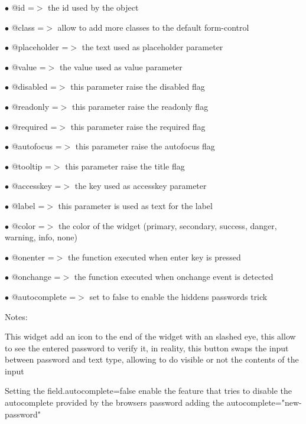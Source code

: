 \documentclass[a4paper]{article}
\begin{document}
\begin{compactitem}
\item[\color{myblue}$\bullet$] @id           =$>$ the id used by the object
\item[\color{myblue}$\bullet$] @class        =$>$ allow to add more classes to the default form-control
\item[\color{myblue}$\bullet$] @placeholder  =$>$ the text used as placeholder parameter
\item[\color{myblue}$\bullet$] @value        =$>$ the value used as value parameter
\item[\color{myblue}$\bullet$] @disabled     =$>$ this parameter raise the disabled flag
\item[\color{myblue}$\bullet$] @readonly     =$>$ this parameter raise the readonly flag
\item[\color{myblue}$\bullet$] @required     =$>$ this parameter raise the required flag
\item[\color{myblue}$\bullet$] @autofocus    =$>$ this parameter raise the autofocus flag
\item[\color{myblue}$\bullet$] @tooltip      =$>$ this parameter raise the title flag
\item[\color{myblue}$\bullet$] @accesskey    =$>$ the key used as accesskey parameter
\item[\color{myblue}$\bullet$] @label        =$>$ this parameter is used as text for the label
\item[\color{myblue}$\bullet$] @color        =$>$ the color of the widget (primary, secondary, success, danger, warning, info, none)
\item[\color{myblue}$\bullet$] @onenter      =$>$ the function executed when enter key is pressed
\item[\color{myblue}$\bullet$] @onchange     =$>$ the function executed when onchange event is detected
\item[\color{myblue}$\bullet$] @autocomplete =$>$ set to false to enable the hiddens passwords trick
\end{compactitem}

Notes:

This widget add an icon to the end of the widget with an slashed eye, this allow to
see the entered password to verify it, in reality, this button swaps the input between
password and text type, allowing to do visible or not the contents of the input

Setting the field.autocomplete=false enable the feature that tries to disable the
autocomplete provided by the browsers password adding the autocomplete="new-password"
\end{document}
